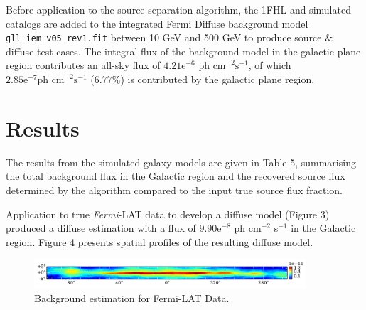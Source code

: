 \documentclass{PoS}
\begin{document}
Before application to the source separation algorithm, the 1FHL and simulated catalogs are added to the integrated Fermi Diffuse background model \verb|gll_iem_v05_rev1.fit| between 10 GeV and 500 GeV to produce source \& diffuse test cases. The integral flux of the background model in the galactic plane region contributes an all-sky flux of $4.21\text{e}^{-6}$ $ \text{ph cm}^{-2} \text{s}^{-1}$, of which $2.85\text{e}^{-7} \text{ph cm}^{-2}\text{s}^{-1}$ ($6.77\%$) is contributed by the galactic plane region.


\section{Results}

The results from the simulated galaxy models are given in Table 5, summarising the total background flux in the Galactic region and the recovered source flux determined by the algorithm compared to the input true source flux fraction.

\begin{table}
\centering
{}
\makeatletter
\def\@captype{table}
\makeatother
\caption{Galactic plane recovered background fluxes}
\end{table}

Application to true \textit{Fermi}-LAT data to develop a diffuse model (Figure 3) produced a diffuse estimation with a flux of $9.90\text{e}^{-8}$ ph cm$^{-2}$ s$^{-1}$ in the Galactic region. Figure 4 presents spatial profiles of the resulting diffuse model.

\begin{figure}
  \begin{center}
      \includegraphics[width=0.9\textwidth]{figures/BG_DATA.pdf}
  \caption{Background estimation for Fermi-LAT Data.}
  \end{center}
\end{figure}
\end{document}
